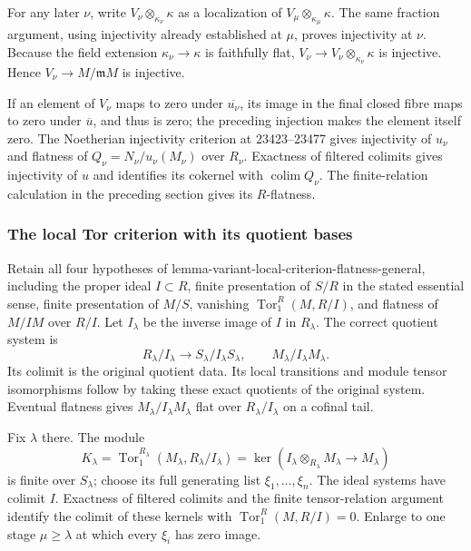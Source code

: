 For any later \(\nu\), write \(V_\nu\otimes_{\kappa_\nu}\kappa\) as a localization of \(V_\mu\otimes_{\kappa_\mu}\kappa\). The same fraction argument, using injectivity already established at \(\mu\), proves injectivity at \(\nu\). Because the field extension \(\kappa_\nu\to\kappa\) is faithfully flat, \(V_\nu\to V_\nu\otimes_{\kappa_\nu}\kappa\) is injective. Hence \(V_\nu\to M/\mathfrak mM\) is injective.

If an element of \(V_\nu\) maps to zero under \(\overline{u_\nu}\), its image in the final closed fibre maps to zero under \(\overline u\), and thus is zero; the preceding injection makes the element itself zero. The Noetherian injectivity criterion at 23423--23477 gives injectivity of \(u_\nu\) and flatness of \(Q_\nu=N_\nu/u_\nu(M_\nu)\) over \(R_\nu\). Exactness of filtered colimits gives injectivity of \(u\) and identifies its cokernel with \(\operatorname{colim}Q_\nu\). The finite-relation calculation in the preceding section gives its \(R\)-flatness.

\subsubsection{The local Tor criterion with its quotient bases}\label{the-local-tor-criterion-with-its-quotient-bases}

Retain all four hypotheses of lemma-variant-local-criterion-flatness-general, including the proper ideal \(I\subset R\), finite presentation of \(S/R\) in the stated essential sense, finite presentation of \(M/S\), vanishing \(\operatorname{Tor}_1^R(M,R/I)\), and flatness of \(M/IM\) over \(R/I\). Let \(I_\lambda\) be the inverse image of \(I\) in \(R_\lambda\). The correct quotient system is \[
R_\lambda/I_\lambda\longrightarrow S_\lambda/I_\lambda S_\lambda,
\qquad M_\lambda/I_\lambda M_\lambda.
\] Its colimit is the original quotient data. Its local transitions and module tensor isomorphisms follow by taking these exact quotients of the original system. Eventual flatness gives \(M_\lambda/I_\lambda M_\lambda\) flat over \(R_\lambda/I_\lambda\) on a cofinal tail.

Fix \(\lambda\) there. The module \[
K_\lambda=\operatorname{Tor}_1^{R_\lambda}(M_\lambda,R_\lambda/I_\lambda)
 =\ker(I_\lambda\otimes_{R_\lambda}M_\lambda\to M_\lambda)
\] is finite over \(S_\lambda\); choose its full generating list \(\xi_1,\ldots,\xi_n\). The ideal systems have colimit \(I\). Exactness of filtered colimits and the finite tensor-relation argument identify the colimit of these kernels with \(\operatorname{Tor}_1^R(M,R/I)=0\). Enlarge to one stage \(\mu\geq\lambda\) at which every \(\xi_i\) has zero image.

